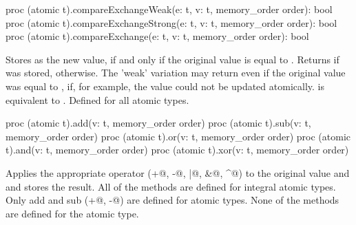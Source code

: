 \begin{protohead}
proc (atomic t).compareExchangeWeak(e: t, v: t, memory_order order): bool
proc (atomic t).compareExchangeStrong(e: t, v: t, memory_order order): bool
proc (atomic t).compareExchange(e: t, v: t, memory_order order): bool
\end{protohead}
\begin{protobody}
Stores  as the new value, if and only if the original value is
equal to . Returns  if  was
stored,  otherwise. The 'weak' variation may
return  even if the original value was equal to ,
if, for example, the value could not be updated
atomically.  is equivalent to
.  Defined for all atomic types.
\end{protobody}

\begin{protohead}
proc (atomic t).add(v: t, memory_order order)
proc (atomic t).sub(v: t, memory_order order)
proc (atomic t).or(v: t, memory_order order)
proc (atomic t).and(v: t, memory_order order)
proc (atomic t).xor(v: t, memory_order order)
\end{protohead}
\begin{protobody}
Applies the appropriate operator (\verb@+@, \verb@-@, \verb@|@,
\verb@&@, \verb@^@) to the original value and  and stores the result.
All of the methods are defined for integral atomic types. Only add and
sub (\verb@+@, \verb@-@) are defined for  atomic types.
None of the methods are defined for the  atomic type.
\end{protobody}

